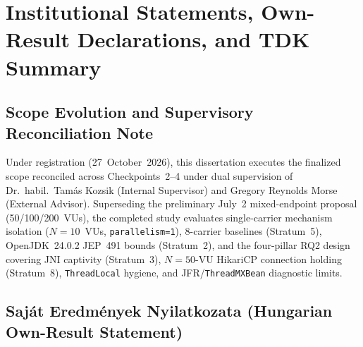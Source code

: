 \chapter{Institutional Statements, Own-Result Declarations, and TDK Summary}
\label{app:own-results-tdk}

\section{Scope Evolution and Supervisory Reconciliation Note}
\label{sec:scope-evolution-note}

Under registration  (27~October~2026), this dissertation executes the finalized scope reconciled across Checkpoints~2--4 under dual supervision of Dr.~habil.\ Tamás Kozsik (Internal Supervisor) and Gregory Reynolds Morse (External Advisor). Superseding the preliminary July~2 mixed-endpoint proposal (50/100/200~VUs), the completed study evaluates single-carrier mechanism isolation ($N=10$~VUs, \texttt{parallelism=1}), 8-carrier baselines (Stratum~5), OpenJDK~24.0.2 JEP~491 bounds (Stratum~2), and the four-pillar RQ2 design covering JNI captivity (Stratum~3), $N=50$-VU HikariCP connection holding (Stratum~8), \texttt{ThreadLocal} hygiene, and JFR/\texttt{ThreadMXBean} diagnostic limits.

\section{Saját Eredmények Nyilatkozata (Hungarian Own-Result Statement)}
\label{sec:hungarian-own-results}

